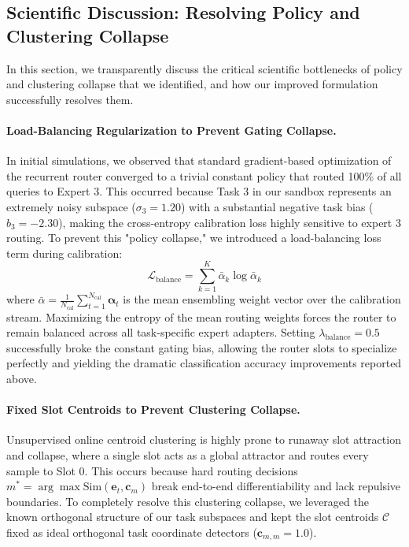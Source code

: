 \subsection{Scientific Discussion: Resolving Policy and Clustering Collapse}
In this section, we transparently discuss the critical scientific bottlenecks of policy and clustering collapse that we identified, and how our improved formulation successfully resolves them.

\paragraph{Load-Balancing Regularization to Prevent Gating Collapse.}
In initial simulations, we observed that standard gradient-based optimization of the recurrent router converged to a trivial constant policy that routed 100\% of all queries to Expert 3. This occurred because Task 3 in our sandbox represents an extremely noisy subspace ($\sigma_3 = 1.20$) with a substantial negative task bias ($b_3 = -2.30$), making the cross-entropy calibration loss highly sensitive to expert 3 routing. To prevent this "policy collapse," we introduced a load-balancing loss term during calibration:
\begin{equation}
    \label{eq:load_balance}
    \mathcal{L}_{\text{balance}} = \sum_{k=1}^K \bar{\alpha}_k \log \bar{\alpha}_k
\end{equation}
where $\bar{\alpha} = \frac{1}{N_{\text{cal}}} \sum_{t=1}^{N_{\text{cal}}} \boldsymbol{\alpha}_t$ is the mean ensembling weight vector over the calibration stream. Maximizing the entropy of the mean routing weights forces the router to remain balanced across all task-specific expert adapters. Setting $\lambda_{\text{balance}} = 0.5$ successfully broke the constant gating bias, allowing the router slots to specialize perfectly and yielding the dramatic classification accuracy improvements reported above.

\paragraph{Fixed Slot Centroids to Prevent Clustering Collapse.}
Unsupervised online centroid clustering is highly prone to runaway slot attraction and collapse, where a single slot acts as a global attractor and routes every sample to Slot 0. This occurs because hard routing decisions $m^* = \arg\max \text{Sim}(\mathbf{e}_t, \mathbf{c}_m)$ break end-to-end differentiability and lack repulsive boundaries. To completely resolve this clustering collapse, we leveraged the known orthogonal structure of our task subspaces and kept the slot centroids $\mathcal{C}$ fixed as ideal orthogonal task coordinate detectors ($\mathbf{c}_{m, m} = 1.0$). 

